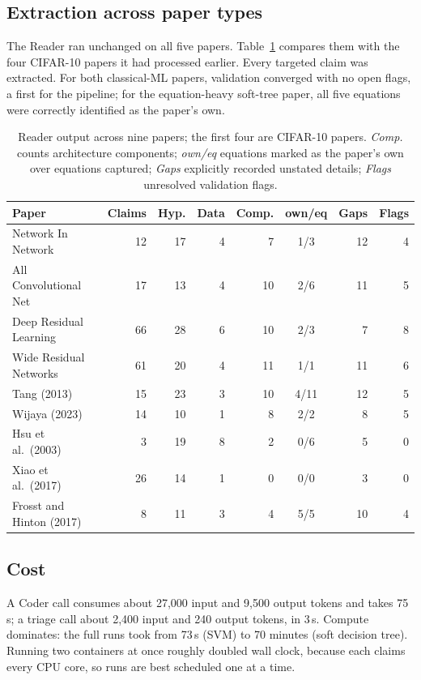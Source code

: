 \documentclass[10pt,twocolumn]{article}
\begin{document}
\subsection{Extraction across paper types}

The Reader ran unchanged on all five papers. Table~\ref{tab:reader} compares them with the four
CIFAR-10 papers it had processed earlier. Every targeted claim was extracted. For both
classical-ML papers, validation converged with no open flags, a first for the pipeline; for the
equation-heavy soft-tree paper, all five equations were correctly identified as the paper's
own.

\begin{table}[tbp]
\centering
\small
\caption{Reader output across nine papers; the first four are CIFAR-10 papers. \emph{Comp.}
counts architecture components; \emph{own/eq} equations marked as the paper's own over
equations captured; \emph{Gaps} explicitly recorded unstated details; \emph{Flags} unresolved
validation flags.}
\label{tab:reader}
\begin{tabular}{lrrrrcrr}
\toprule
Paper & Claims & Hyp. & Data & Comp. & own/eq & Gaps & Flags \\
\midrule
Network In Network      & 12 & 17 & 4 &  7 & 1/3  & 12 & 4 \\
All Convolutional Net   & 17 & 13 & 4 & 10 & 2/6  & 11 & 5 \\
Deep Residual Learning  & 66 & 28 & 6 & 10 & 2/3  &  7 & 8 \\
Wide Residual Networks  & 61 & 20 & 4 & 11 & 1/1  & 11 & 6 \\
\midrule
Tang (2013)                  & 15 & 23 & 3 & 10 & 4/11 & 12 & 5 \\
Wijaya (2023)                & 14 & 10 & 1 &  8 & 2/2  &  8 & 5 \\
Hsu et al.\ (2003)           &  3 & 19 & 8 &  2 & 0/6  &  5 & 0 \\
Xiao et al.\ (2017)          & 26 & 14 & 1 &  0 & 0/0  &  3 & 0 \\
Frosst and Hinton (2017)     &  8 & 11 & 3 &  4 & 5/5  & 10 & 4 \\
\bottomrule
\end{tabular}
\end{table}

\subsection{Cost}

A Coder call consumes about 27{,}000 input and 9{,}500 output tokens and takes 75\,s; a triage
call about 2{,}400 input and 240 output tokens, in 3\,s. Compute dominates: the full runs took
from 73\,s (SVM) to 70 minutes (soft decision tree). Running two containers at once roughly doubled wall
clock, because each claims every CPU core, so runs are best scheduled one at a time.
\end{document}

